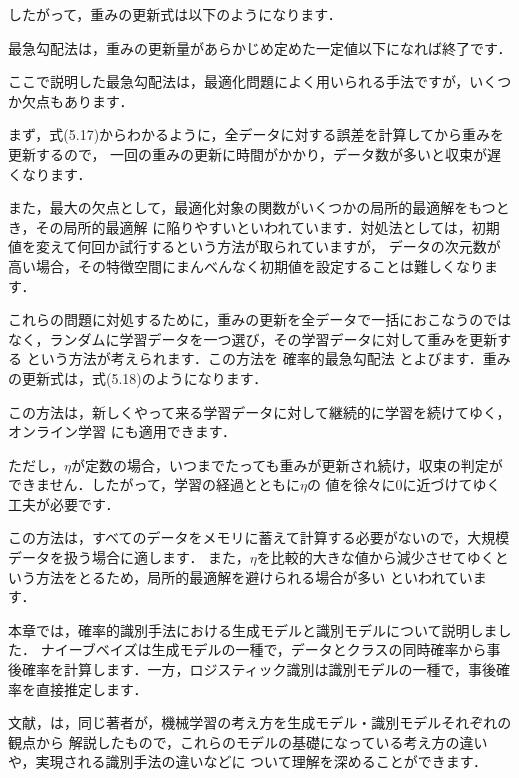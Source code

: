 したがって，重みの更新式は以下のようになります．

最急勾配法は，重みの更新量があらかじめ定めた一定値以下になれば終了です．


ここで説明した最急勾配法は，最適化問題によく用いられる手法ですが，いくつか欠点もあります．

まず，式(5.17)からわかるように，全データに対する誤差を計算してから重みを更新するので，
一回の重みの更新に時間がかかり，データ数が多いと収束が遅くなります．

また，最大の欠点として，最適化対象の関数がいくつかの局所的最適解をもつとき，その局所的最適解
に陥りやすいといわれています．対処法としては，初期値を変えて何回か試行するという方法が取られていますが，
データの次元数が高い場合，その特徴空間にまんべんなく初期値を設定することは難しくなります．

これらの問題に対処するために，重みの更新を全データで一括におこなうのではなく，ランダムに学習データを一つ選び，その学習データに対して重みを更新する
という方法が考えられます．この方法を
確率的最急勾配法
とよびます．重みの更新式は，式(5.18)のようになります．


この方法は，新しくやって来る学習データに対して継続的に学習を続けてゆく，
オンライン学習
にも適用できます．

ただし，$\eta$が定数の場合，いつまでたっても重みが更新され続け，収束の判定ができません．したがって，学習の経過とともに$\eta$の
値を徐々に0に近づけてゆく工夫が必要です．

この方法は，すべてのデータをメモリに蓄えて計算する必要がないので，大規模データを扱う場合に適します．
また，$\eta$を比較的大きな値から減少させてゆくという方法をとるため，局所的最適解を避けられる場合が多い
といわれています．

本章では，確率的識別手法における生成モデルと識別モデルについて説明しました．
ナイーブベイズは生成モデルの一種で，データとクラスの同時確率から事後確率を計算します．一方，ロジスティック識別は識別モデルの一種で，事後確率を直接推定します．

文献\cite{sugiyama09}，\cite{sugiyama13}は，同じ著者が，機械学習の考え方を生成モデル・識別モデルそれぞれの観点から
解説したもので，これらのモデルの基礎になっている考え方の違いや，実現される識別手法の違いなどに
ついて理解を深めることができます．
